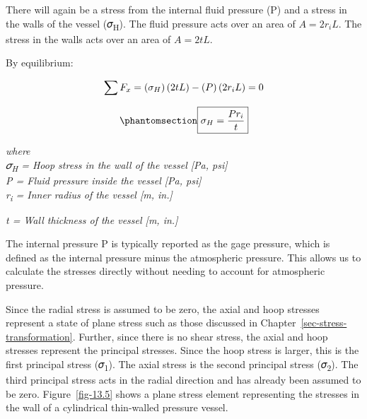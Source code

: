 \documentclass[
  letterpaper,
  DIV=11,
  numbers=noendperiod]{scrreprt}
\theoremstyle{definition}
\theoremstyle{remark}
\begin{document}
There will again be a stress from the internal fluid pressure (P) and a
stress in the walls of the vessel (𝜎\textsubscript{H}). The fluid
pressure acts over an area of \(A=2 r_i L\). The stress in the walls
acts over an area of \(A=2 t L\).

By equilibrium:

\[
\sum F_x=\left(\sigma_H\right)(2 t L)-(P)\left(2 r_i L\right)=0 \\
\]

\begin{equation}\phantomsection\label{eq-13.2}{
\boxed{\sigma_H=\frac{P r_i}{t}}
}\end{equation}

\emph{where}\\
\emph{𝜎\textsubscript{H} = Hoop stress in the wall of the vessel {[}Pa,
psi{]}}\\
\emph{P = Fluid pressure inside the vessel {[}Pa, psi{]}}\\
\emph{r\textsubscript{i} = Inner radius of the vessel {[}m, in.{]}}

\emph{t = Wall thickness of the vessel {[}m, in.{]}}

The internal pressure P is typically reported as the gage pressure,
which is defined as the internal pressure minus the atmospheric
pressure. This allows us to calculate the stresses directly without
needing to account for atmospheric pressure.

Since the radial stress is assumed to be zero, the axial and hoop
stresses represent a state of plane stress such as those discussed in
Chapter~\ref{sec-stress-transformation}. Further, since there is no
shear stress, the axial and hoop stresses represent the principal
stresses. Since the hoop stress is larger, this is the first principal
stress (𝜎\textsubscript{1}). The axial stress is the second principal
stress (𝜎\textsubscript{2}). The third principal stress acts in the
radial direction and has already been assumed to be zero.
Figure~\ref{fig-13.5} shows a plane stress element representing the
stresses in the wall of a cylindrical thin-walled pressure vessel.
\end{document}
